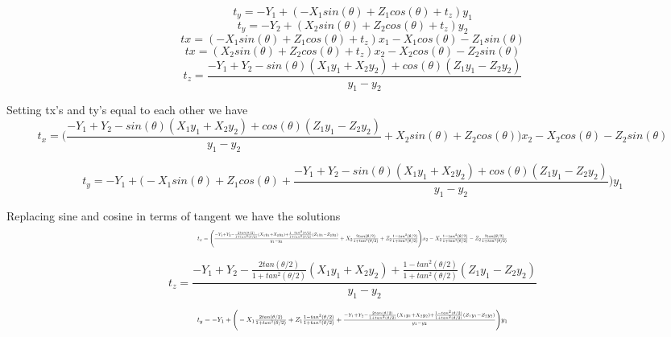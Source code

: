 \documentclass[11pt,english]{article}
\begin{document}
$$ t_y = -Y_1 + (-X_1 sin(\theta) + Z_1 cos(\theta) + t_z ) y_1$$
$$ t_y = -Y_2 + (X_2 sin(\theta) + Z_2 cos(\theta) + t_z ) y_2$$
$$ tx = (-X_1 sin(\theta) + Z_1 cos(\theta) + t_z )x_1 -X_1 cos(\theta) - Z_1 sin(\theta) $$
$$ tx =(X_2 sin(\theta) + Z_2 cos(\theta) + t_z )x_2 - X_2 cos(\theta) - Z_2 sin(\theta) $$
$$ t_z = \frac{-Y_1 + Y_2 - sin(\theta) (X_1 y_1 + X_2 y_2) + cos(\theta) (Z_1 y_1 - Z_2 y_2)}{y_1- y_2} 
$$

Setting tx's and ty's equal to each other we have 
$$
t_x = \Bigg( \frac{-Y_1 + Y_2 - sin(\theta) (X_1 y_1 + X_2 y_2) + cos(\theta) (Z_1 y_1 - Z_2 y_2)}{y_1 - y_2} +X_2 sin(\theta) + Z_2 cos(\theta)\Bigg)x_2 - X_2 cos(\theta) - Z_2 sin(\theta) 
$$

$$
t_y = -Y_1 + \Bigg( -X_1 sin(\theta) + Z_1 cos(\theta)  + \frac{-Y_1 + Y_2 - sin(\theta) (X_1 y_1 + X_2 y_2) + cos(\theta) (Z_1 y_1 - Z_2 y_2)}{y_1- y_2} \Bigg) y_1
$$


Replacing sine and cosine in terms of tangent we have the solutions
\begin{equation}
\resizebox{.8\hsize}{!}{$
t_x = \Bigg( \frac{-Y_1 + Y_2 -\frac{2tan(\theta/2)}{1 + tan^2(\theta /2)} (X_1 y_1 + X_2 y_2) +\frac{1-tan^2(\theta/2)}{1 + tan^2(\theta /2)} (Z_1 y_1 - Z_2 y_2)}{y_1 - y_2} +X_2 \frac{2tan(\theta/2)}{1 + tan^2(\theta /2)} + Z_2\frac{1-tan^2(\theta/2)}{1 + tan^2(\theta /2)}\Bigg)x_2 - X_2 \frac{1-tan^2(\theta/2)}{1 + tan^2(\theta /2)} - Z_2 \frac{2tan(\theta/2)}{1 + tan^2(\theta /2)}
$} 
\end{equation}

\begin{equation}
  t_z = \frac{-Y_1 + Y_2 -\frac{2tan(\theta/2)}{1 + tan^2(\theta /2)} (X_1 y_1 + X_2 y_2) +\frac{1-tan^2(\theta/2)}{1 + tan^2(\theta /2)} (Z_1 y_1 - Z_2 y_2)}{y_1 - y_2} 
\end{equation}

\begin{equation}
\resizebox{.8\hsize}{!}{$
t_y = -Y_1 + \Bigg( -X_1 \frac{2tan(\theta/2)}{1 + tan^2(\theta /2)}  + Z_1 \frac{1-tan^2(\theta/2)}{1 + tan^2(\theta /2)}  + \frac{-Y_1 + Y_2 - \frac{2tan(\theta/2)}{1 + tan^2(\theta /2)} (X_1 y_1 + X_2 y_2) +\frac{1-tan^2(\theta/2)}{1 + tan^2(\theta /2)} (Z_1 y_1 - Z_2 y_2)}{y_1- y_2} \Bigg) y_1$}
\end{equation}
\end{document}
